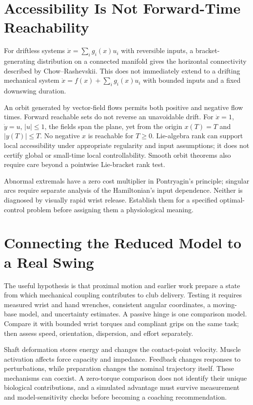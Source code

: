\documentclass[12pt, openany]{book}
\theoremstyle{plain}
\begin{document}
\section{Accessibility Is Not Forward-Time Reachability}

For driftless systems $\dot x=\sum_i g_i(x)u_i$ with reversible inputs, a
bracket-generating distribution on a connected manifold gives the horizontal
connectivity described by Chow--Rashevskii. This does not immediately extend
to a drifting mechanical system $\dot x=f(x)+\sum_i g_i(x)u_i$ with bounded
inputs and a fixed downswing duration.

An orbit generated by vector-field flows permits both positive and negative
flow times. Forward reachable sets do not reverse an unavoidable drift.
For $\dot x=1$, $\dot y=u$, $|u|\leq1$, the fields span the plane, yet from
the origin $x(T)=T$ and $|y(T)|\leq T$. No negative $x$ is reachable for
$T\geq0$. Lie-algebra rank can support local accessibility under appropriate
regularity and input assumptions; it does not certify global or small-time
local controllability. Smooth orbit theorems also require care beyond a
pointwise Lie-bracket rank test.

Abnormal extremals have a zero cost multiplier in Pontryagin's principle;
singular arcs require separate analysis of the Hamiltonian's input dependence.
Neither is diagnosed by visually rapid wrist release. Establish them for a
specified optimal-control problem before assigning them a physiological meaning.

\section{Connecting the Reduced Model to a Real Swing}

The useful hypothesis is that proximal motion and earlier work prepare a state
from which mechanical coupling contributes to club delivery. Testing it requires
measured wrist and hand wrenches, consistent angular coordinates, a moving-base
model, and uncertainty estimates. A passive hinge is one comparison model.
Compare it with bounded wrist torques and compliant grips on the same task;
then assess speed, orientation, dispersion, and effort separately.

Shaft deformation stores energy and changes the contact-point velocity. Muscle
activation affects force capacity and impedance. Feedback changes responses to
perturbations, while preparation changes the nominal trajectory itself. These
mechanisms can coexist. A zero-torque comparison does not identify their unique
biological contributions, and a simulated advantage must survive measurement
and model-sensitivity checks before becoming a coaching recommendation.
\end{document}
